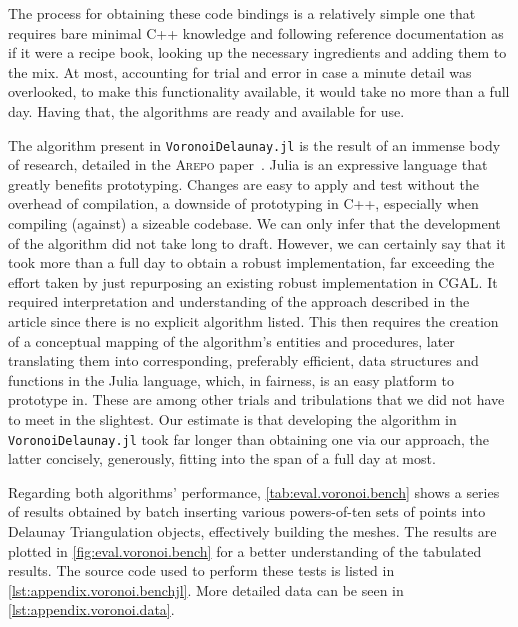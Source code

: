 The process for obtaining these code bindings is a relatively simple one that
requires bare minimal C++ knowledge and following reference documentation as if
it were a recipe book, looking up the necessary ingredients and adding them to
the mix.  At most, accounting for trial and error in case a minute detail was
overlooked, to make this functionality available, it would take no more than a
full day.  Having that, the algorithms are ready and available for use.

The algorithm present in \texttt{VoronoiDelaunay.jl} is the result of an immense
body of research, detailed in the \textsc{Arepo}
paper~\cite{Springel:2010:GCHSMM}.  Julia is an expressive language that greatly
benefits prototyping.  Changes are easy to apply and test without the overhead
of compilation, a downside of prototyping in C++, especially when compiling
(against) a sizeable codebase.  We can only infer that the development of the
algorithm did not take long to draft.  However, we can certainly say that it
took more than a full day to obtain a robust implementation, far exceeding the
effort taken by just repurposing an existing robust implementation in \ac{CGAL}.
It required interpretation and understanding of the approach described in the
article since there is no explicit algorithm listed.  This then requires the
creation of a conceptual mapping of the algorithm's entities and procedures,
later translating them into corresponding, preferably efficient, data structures
and functions in the Julia language, which, in fairness, is an easy platform to
prototype in.  These are among other trials and tribulations that we did not
have to meet in the slightest.  Our estimate is that developing the algorithm in
\texttt{VoronoiDelaunay.jl} took far longer than obtaining one via our approach,
the latter concisely, generously, fitting into the span of a full day at most.

Regarding both algorithms' performance, \cref{tab:eval.voronoi.bench} shows a
series of results obtained by batch inserting various powers-of-ten sets of
points into Delaunay Triangulation objects, effectively building the meshes.
The results are plotted in \cref{fig:eval.voronoi.bench} for a better
understanding of the tabulated results.  The source code used to perform these
tests is listed in \cref{lst:appendix.voronoi.benchjl}.  More detailed data can
be seen in \cref{lst:appendix.voronoi.data}.

